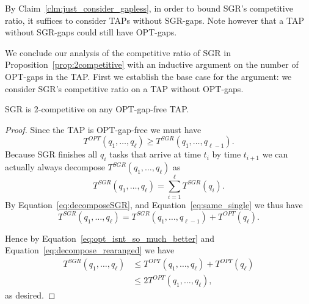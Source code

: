 By Claim~\ref{clm:just_consider_gapless}, in order to bound SGR's
competitive ratio, it suffices to consider TAPs
without SGR-gaps. Note however that a TAP without
SGR-gaps could still have OPT-gaps.

We conclude our analysis of the competitive ratio of SGR in
Proposition~\ref{prop:2competitive} with an inductive argument on
the number of OPT-gaps in the TAP.
First we establish the base case for the argument: we consider
SGR's competitive ratio on a TAP without OPT-gaps.  

\begin{claim}
  \label{clm:no_optgaps}
  SGR is $2$-competitive on any OPT-gap-free TAP.
\end{claim}
\begin{proof}
  Since the TAP is OPT-gap-free we must have
  \begin{equation}
    \label{eq:opt_isnt_so_much_better}
    T^{OPT}(q_1, \ldots, q_{\ell}) \ge T^{SGR}(q_1, \ldots, q_{\ell-1}).
  \end{equation}
  Because SGR finishes all $q_{i}$ tasks that arrive at time $t_i$
  by time $t_{i+1}$ we can actually always decompose
  $T^{SGR}(q_1, \ldots, q_\ell)$ as 
  \begin{equation}
    \label{eq:decomposeSGR}
    T^{SGR}(q_1, \ldots, q_\ell) = \sum_{i=1}^\ell T^{SGR}(q_i).
  \end{equation}
  By Equation~\eqref{eq:decomposeSGR}, and
  Equation~\eqref{eq:same_single} we thus have 
  \begin{equation}
    \label{eq:decompose_rearanged}
    T^{SGR}(q_1, \ldots, q_\ell) = T^{SGR}(q_1, \ldots, q_{\ell-1}) + T^{OPT}(q_\ell).
  \end{equation}

  Hence by Equation~\eqref{eq:opt_isnt_so_much_better} and
  Equation~\eqref{eq:decompose_rearanged} we have
  \begin{align*}
    T^{SGR}(q_1, \ldots, q_\ell) &\le T^{OPT}(q_1, \ldots, q_\ell) + T^{OPT}(q_\ell)\\
                                   &\le 2T^{OPT}(q_1, \ldots, q_\ell),
  \end{align*}
  as desired.
\end{proof}

